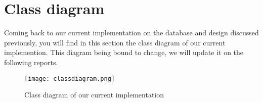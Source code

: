 \section{Class diagram}

Coming back to our current implementation on the database and design discussed previously, you will find in this section the class diagram of our current implemention. This diagram being bound to change, we will update it on the following reports.

\begin{figure}[H]
	\centering
	\texttt{[image: classdiagram.png]}
	\caption{Class diagram of our current implementation}
	\label{fig:length_eight_mouse}
\end{figure}